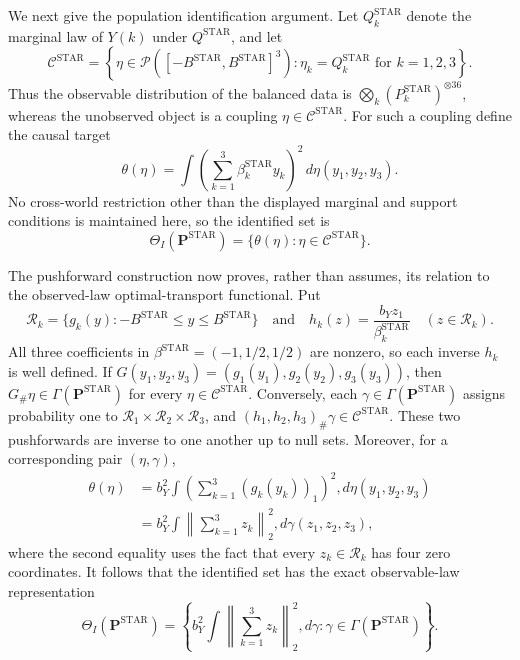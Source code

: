 We next give the population identification argument.  Let
\(Q_k^{\mathrm{STAR}}\) denote the marginal law of \(Y(k)\) under
\(Q^{\mathrm{STAR}}\), and let
\[
 \mathcal C^{\mathrm{STAR}}
 =\left\{\eta\in
 \mathcal P([-B^{\mathrm{STAR}},B^{\mathrm{STAR}}]^3):
 \eta_k=Q_k^{\mathrm{STAR}}\text{ for }k=1,2,3\right\}.
\]
Thus the observable distribution of the balanced data is
\(\bigotimes_k(P_k^{\mathrm{STAR}})^{\otimes36}\), whereas the unobserved
object is a coupling \(\eta\in\mathcal C^{\mathrm{STAR}}\).  For such a
coupling define the causal target
\[
 \theta(\eta)=\int
 \left(\sum_{k=1}^3\beta_k^{\mathrm{STAR}}y_k\right)^2
 \,d\eta(y_1,y_2,y_3).
\]
No cross-world restriction other than the displayed marginal and support
conditions is maintained here, so the identified set is
\[
 \Theta_I(\mathbf P^{\mathrm{STAR}})
 =\{\theta(\eta):\eta\in\mathcal C^{\mathrm{STAR}}\}.
\]

The pushforward construction now proves, rather than assumes, its relation to
the observed-law optimal-transport functional.  Put
\[
 \mathcal R_k
 =\{g_k(y):-B^{\mathrm{STAR}}\leq y\leq B^{\mathrm{STAR}}\}
 \quad\text{and}\quad
 h_k(z)=\frac{b_Yz_1}{\beta_k^{\mathrm{STAR}}}
 \quad(z\in\mathcal R_k).
\]
All three coefficients in
\(\beta^{\mathrm{STAR}}=(-1,1/2,1/2)\) are nonzero, so each inverse \(h_k\) is
well defined.  If \(G(y_1,y_2,y_3)=(g_1(y_1),g_2(y_2),g_3(y_3))\), then
\(G_\#\eta\in\Gamma(\mathbf P^{\mathrm{STAR}})\) for every
\(\eta\in\mathcal C^{\mathrm{STAR}}\).  Conversely, each
\(\gamma\in\Gamma(\mathbf P^{\mathrm{STAR}})\) assigns probability one to
\(\mathcal R_1\times\mathcal R_2\times\mathcal R_3\), and
\((h_1,h_2,h_3)_\#\gamma\in\mathcal C^{\mathrm{STAR}}\).  These two
pushforwards are inverse to one another up to null sets.  Moreover, for a
corresponding pair \((\eta,\gamma)\),
\[
\begin{aligned}
 \theta(\eta)
 &=b_Y^2\int
 \left(\sum_{k=1}^3(g_k(y_k))_1\right)^2,d\eta(y_1,y_2,y_3)\\
 &=b_Y^2\int
 \left\|\sum_{k=1}^3z_k\right\|_2^2,d\gamma(z_1,z_2,z_3),
\end{aligned}
\]
where the second equality uses the fact that every \(z_k\in\mathcal R_k\)
has four zero coordinates.  It follows that the identified set has the exact
observable-law representation
\[
 \Theta_I(\mathbf P^{\mathrm{STAR}})
 =\left\{b_Y^2\int\left\|\sum_{k=1}^3z_k\right\|_2^2,d\gamma:
 \gamma\in\Gamma(\mathbf P^{\mathrm{STAR}})\right\}.
\]

